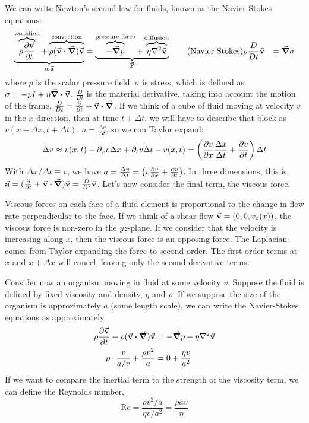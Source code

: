 \documentclass[a4paper,twoside,master.tex]{subfiles}
\begin{document}
We can write Newton's second law for fluids, known as the Navier-Stokes equations:
\begin{align}
    \underbrace{\overbrace{\rho \pdv{\va{v}}{t}}^{\text{variation}} + \overbrace{\rho (\va{v} \vdot \grad) \va{v}}^{\text{convection}}}_{m \va{a}} &= \underbrace{\overbrace{- \grad{p}}^{\text{pressure force}} + \overbrace{\eta \laplacian{\va{v}}}^{\text{diffusion}}}_{\va{F}} \tag{Navier-Stokes}
    \rho \frac{D}{Dt} \va{v} &= \grad{\sigma}

\end{align}
where $ p $ is the scalar pressure field. $ \sigma $ is stress, which is defined as $ \sigma = -p I + \eta \div{\va{v}} $. $ \frac{D}{Dt} $ is the material derivative, taking into account the motion of the frame, $ \frac{D}{Dt} = \pdv{t} + \va{v} \vdot \grad $. If we think of a cube of fluid moving at velocity $ v $ in the $ x $-direction, then at time $ t + \Delta t $, we will have to describe that block as $ v(x + \Delta x, t + \Delta t) $. $ a = \frac{\Delta v}{\Delta t} $, so we can Taylor expand:
\begin{equation}
    \Delta v \approx v(x,t) + \partial_x v \Delta x + \partial_t v \Delta t - v(x, t) = \left( \pdv{v}{x} \frac{\Delta x}{\Delta t} + \pdv{v}{t} \right) \Delta t
\end{equation}
With $ \Delta x / \Delta t \equiv v $, we have $ a = \frac{\Delta v}{\Delta t} = \left( v \pdv{v}{x} + \pdv{v}{t} \right) $. In three dimensions, this is $ \va{a} = (\pdv{t} + \va{v} \vdot \grad) \va{v} = \frac{D}{Dt} \va{v} $. Let's now consider the final term, the viscous force.

Viscous forces on each face of a fluid element is proportional to the change in flow rate perpendicular to the face. If we think of a shear flow $ \va{v} = (0, 0, v_z(x)) $, the viscous force is non-zero in the $ yz $-plane. If we consider that the velocity is increasing along $ x $, then the viscous force is an opposing force. The Laplacian comes from Taylor expanding the force to second order. The first order terms at $ x $ and $ x + \Delta x $ will cancel, leaving only the second derivative terms.

Consider now an organism moving in fluid at some velocity $ v $. Suppose the fluid is defined by fixed viscosity and density, $ \eta $ and $ \rho $. If we suppose the size of the organism is approximately $ a $ (some length scale), we can write the Navier-Stokes equations as approximately
\begin{align}
    \rho \pdv{\va{v}}{t} + \rho (\va{v} \vdot \grad) \va{v} &= - \grad{p} + \eta \laplacian{\va{v}} \\
    \rho \cdot \frac{v}{a/v} + \frac{\rho v^2}{a} &= 0 + \frac{\eta v}{a^2} \\
\end{align}
If we want to compare the inertial term to the strength of the viscosity term, we can define the Reynolds number,
\begin{equation}
    \text{Re} = \frac{\rho v^2 / a}{\eta v / a^2} = \frac{\rho a v}{\eta}
\end{equation}
\end{document}

